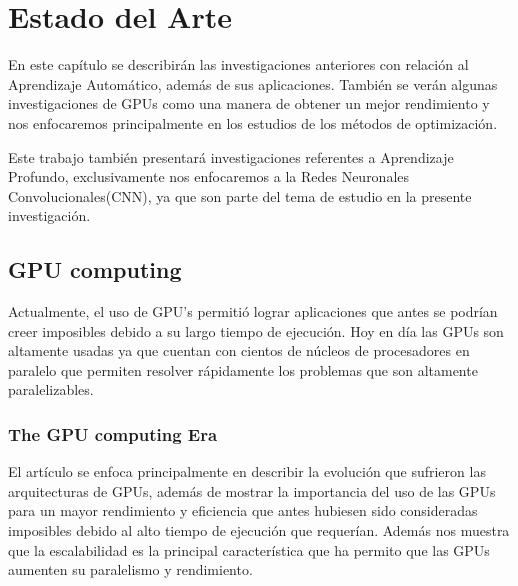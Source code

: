 \chapter{Estado del Arte}
En este capítulo se describirán las investigaciones anteriores con relación al Aprendizaje Automático, además de sus aplicaciones. También se verán algunas investigaciones de GPUs como una manera de obtener un mejor rendimiento y nos enfocaremos principalmente en los estudios de los métodos de optimización.

Este trabajo también presentará investigaciones referentes a Aprendizaje Profundo, exclusivamente nos enfocaremos a la Redes Neuronales Convolucionales(CNN), ya que son parte del tema de estudio en la presente investigación.





\section{GPU computing}
Actualmente, el uso de GPU's permitió lograr aplicaciones que antes se podrían creer imposibles debido a su largo tiempo de ejecución. Hoy en día las GPUs son altamente usadas ya que cuentan con cientos de núcleos de procesadores en paralelo que permiten resolver rápidamente los problemas que son altamente paralelizables.
\subsection{The GPU computing Era}
	El artículo se enfoca principalmente en describir la evolución que sufrieron las arquitecturas de GPUs, además de mostrar la importancia del uso de las GPUs para un mayor rendimiento y eficiencia que antes hubiesen sido consideradas imposibles debido al alto tiempo de ejecución que requerían. Además nos muestra que la escalabilidad es la principal característica que ha permito que las GPUs aumenten su paralelismo y rendimiento.
